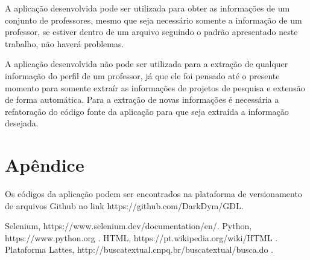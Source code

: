 \documentclass[conference]{IEEEtran}
\begin{document}
A aplicação desenvolvida pode ser utilizada para obter as informações de um conjunto de professores, mesmo que seja necessário somente a informação de um professor, se estiver dentro de um arquivo seguindo o padrão apresentado neste trabalho, não haverá problemas.

A aplicação desenvolvida não pode ser utilizada para a extração de qualquer informação do perfil de um professor, já que ele foi pensado até o presente momento para somente extraír as informações de projetos de pesquisa e extensão de forma automática. Para a extração de novas informações é necessária a refatoração do código fonte da aplicação para que seja extraída a informação desejada.

\section*{Apêndice}
Os códigos da aplicação podem ser encontrados na plataforma de versionamento de arquivos Github no link https://github.com/DarkDym/GDL.

\begin{thebibliography}{00}
 Selenium, https://www.selenium.dev/documentation/en/.
 Python, https://www.python.org .
 HTML, https://pt.wikipedia.org/wiki/HTML .
 Plataforma Lattes, http://buscatextual.cnpq.br/buscatextual/busca.do .
\end{thebibliography}
\end{document}
